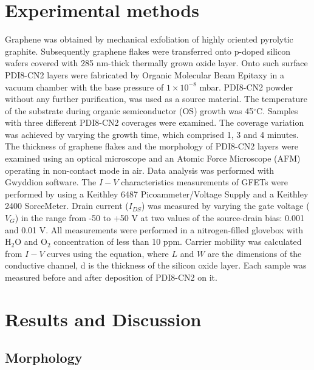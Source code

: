 \documentclass[preprint,aip,jap]{revtex4-2}
\begin{document}
\section{\label{sec:exper}Experimental methods}


Graphene was obtained by mechanical exfoliation of highly oriented pyrolytic graphite. Subsequently graphene flakes were transferred onto p-doped silicon wafers covered with 285 nm-thick thermally grown oxide layer. Onto such surface PDI8-CN2 layers were fabricated by Organic Molecular Beam Epitaxy in a vacuum chamber with the base pressure of $1\times10^{-8}$ mbar. PDI8-CN2 powder without any further purification, was used as a source material. The temperature of the substrate during organic semiconductor (OS) growth was 45$^\circ$C. Samples with three different PDI8-CN2 coverages were examined. The coverage variation was achieved by varying the growth time, which comprised 1, 3 and 4 minutes. The thickness of graphene flakes and the morphology of PDI8-CN2 layers were examined using an optical microscope and an Atomic Force Microscope (AFM) operating in non-contact mode in air. Data analysis was performed with Gwyddion software\cite{necas-2012}. The $I-V$ characteristics measurements of GFETs were performed by using a Keithley 6487 Picoammeter/Voltage Supply and a Keithley 2400 SorceMeter. Drain current ($I_{DS}$) was measured by varying the gate voltage ($V_G$) in the range from -50 to +50 V at two values of the source-drain bias: 0.001 and 0.01 V. All measurements were performed in a nitrogen-filled glovebox with H$_2$O and O$_2$ concentration of less than 10 ppm.  Carrier mobility was calculated from $I-V$ curves using the equation, where $L$ and $W$ are the dimensions of the conductive channel, d is the thickness of the silicon oxide layer. Each sample was measured before and after deposition of PDI8-CN2 on it.

\section{\label{sec:res}Results and Discussion}

\subsection{\label{sec:morph}Morphology}
\end{document}
